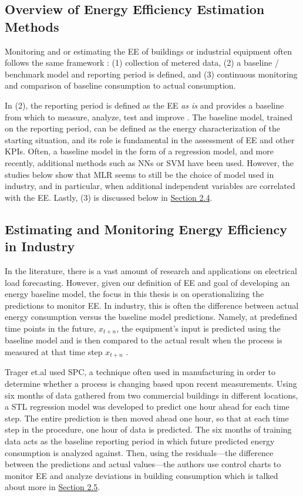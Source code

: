 \subsection{Overview of Energy Efficiency Estimation Methods}

Monitoring and or estimating the EE of buildings or industrial equipment often follows the same framework \cite{kini_methodology_2011}: (1) collection of metered data, (2) a baseline / benchmark model and reporting period is defined, and (3) continuous monitoring and comparison of baseline consumption to actual consumption. 

In (2), the reporting period is defined as the EE \textit{as is} and provides a baseline from which to measure, analyze, test and improve \cite{oakland_statistical_2008}. The baseline model, trained on the reporting period, can be defined as the energy characterization of the starting situation, and its role is fundamental in the assessment of EE and other \ac{KPIs}. Often, a baseline model in the form of a regression model, and more recently, additional methods such as \ac{NNs} or \ac{SVM} have been used. However, the studies below show that  \ac{MLR} seems to still be the choice of model used in industry, and in particular, when additional independent variables are correlated with the EE. Lastly, (3) is discussed below in \hyperlink{subsection.2.4}{Section 2.4}.

\subsection{Estimating and Monitoring Energy Efficiency in Industry}

In the literature, there is a vast amount of research and applications on electrical load forecasting. However, given our definition of EE and goal of developing an energy baseline model, the focus in this thesis is on operationalizing the predictions to monitor EE. In industry, this is often the difference between actual energy consumption versus the baseline model predictions. Namely, at predefined time points in the future, $x_{t+n}$, the equipment's input is predicted using the baseline model and is then compared to the actual result when the process is measured at that time step $x_{t+n}$ \cite{tightening}. 

Trager et.al \cite{tightening} used SPC, a technique often used in manufacturing in order to determine whether a process is changing based upon recent measurements. Using six months of data gathered from two commercial buildings in different locations, a \ac{STL} regression model was developed to predict one hour ahead for each time step. The entire prediction is then moved ahead one hour, so that at each time step in the procedure, one hour of data is predicted. The six months of training data acts as the baseline reporting period in which future predicted energy consumption is analyzed against. Then, using the residuals—the difference between the predictions and actual values—the authors use control charts to monitor EE and analyze deviations in building consumption which is talked about more in \hyperlink{subsection.2.5}{Section 2.5}. 


